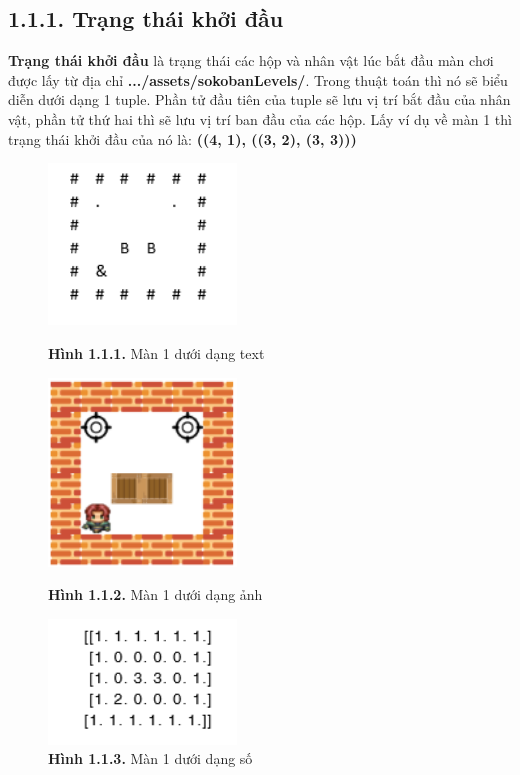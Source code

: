 \documentclass[a4paper,12pt]{article}
\begin{document}
\subsection*{1.1.1. Trạng thái khởi đầu}
\hspace*{7mm}\textbf{Trạng thái khởi đầu} là trạng thái các hộp và nhân vật lúc bắt đầu màn chơi được lấy từ địa chỉ \textbf{.../assets/sokobanLevels/}. Trong thuật toán thì nó sẽ biểu diễn dưới dạng 1 tuple. Phần tử đầu tiên của tuple sẽ lưu vị trí bắt đầu của nhân vật, phần tử thứ hai thì sẽ lưu vị trí ban đầu của các hộp.
Lấy ví dụ về màn 1 thì trạng thái khởi đầu của nó là: \textbf{((4, 1), ((3, 2), (3, 3)))}
\begin{figure}[h]
    \begin{minipage}{0.45\textwidth}
        \centering
        \includegraphics[width=5cm]{Level_1_text.png} 
        \caption*{\textbf{Hình 1.1.1.} Màn 1 dưới dạng text}
        \label{fig:image1}
    \end{minipage}\hfill
    \begin{minipage}{0.45\textwidth}
        \centering
        \includegraphics[width=5cm]{Level_1_render.png} 
        \caption*{\textbf{Hình 1.1.2.} Màn 1 dưới dạng ảnh}
        \label{fig:image2}
    \end{minipage}
    \centering
    \begin{minipage}{0.45\textwidth}
        \centering
        \includegraphics[width=5cm]{Level_1_num.png}
        \caption*{\textbf{Hình 1.1.3.} Màn 1 dưới dạng số}
        \label{fig:image3}
    \end{minipage}
\end{figure}
\end{document}
